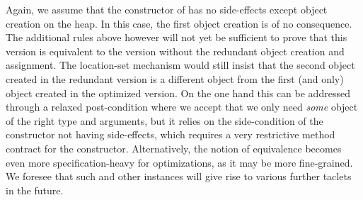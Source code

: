 Again, we assume that the constructor of  has no side-effects except object creation on the heap.
In this case, the first object creation is of no consequence.
The additional rules above however will not yet be sufficient to prove that this version is equivalent to the version without the redundant object creation and assignment.
The location-set mechanism would still insist that the second object created  in the redundant version is a different object from the first (and only) object created in the optimized version.
On the one hand this can be addressed through a relaxed post-condition where we accept that we only need \textit{some} object of the right type and arguments, but it relies on the side-condition of the constructor not having side-effects, which requires a very restrictive method contract for the constructor.
Alternatively, the notion of equivalence becomes even more specification-heavy for optimizations, as it may be more fine-grained.
We foresee that such and other instances will give rise to various further taclets in the future.

